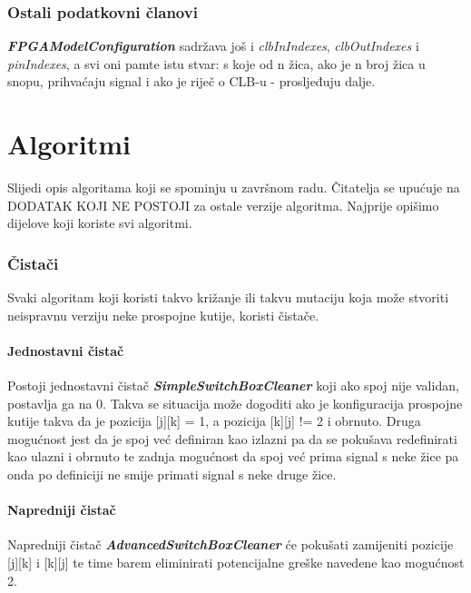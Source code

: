 \documentclass[times, utf8, zavrsni]{fer}
\begin{document}
\subsubsection{Ostali podatkovni članovi}

\textbf{\emph{FPGAModelConfiguration}} sadržava još i \emph{clbInIndexes}, \emph{clbOutIndexes} i \emph{pinIndexes}, a svi oni pamte istu stvar: s koje od n žica, ako je n broj žica u snopu, prihvaćaju signal i ako je riječ o CLB-u - prosljeđuju dalje.

\section{Algoritmi}

Slijedi opis algoritama koji se spominju u završnom radu. Čitatelja se upućuje na DODATAK KOJI NE POSTOJI za ostale verzije algoritma. Najprije opišimo dijelove koji koriste svi algoritmi.

\subsubsection{Čistači}

Svaki algoritam koji koristi takvo križanje ili takvu mutaciju koja može stvoriti neispravnu verziju neke prospojne kutije, koristi čistače. 

\paragraph{Jednostavni čistač}

Postoji jednostavni čistač \textbf{\emph{SimpleSwitchBoxCleaner}} koji ako spoj nije validan, postavlja ga na 0. Takva se situacija može dogoditi ako je konfiguracija prospojne kutije takva da je pozicija [j][k] = 1, a pozicija [k][j] != 2 i obrnuto. Druga mogućnost jest da je spoj već definiran kao izlazni pa da se pokušava redefinirati kao ulazni i obrnuto te zadnja mogućnost da spoj već prima signal s neke žice pa onda po definiciji ne smije primati signal s neke druge žice. 

\paragraph{Napredniji čistač}

Napredniji čistač \textbf{\emph{AdvancedSwitchBoxCleaner}} će pokušati zamijeniti pozicije [j][k] i [k][j] te time barem eliminirati potencijalne greške navedene kao mogućnost 2.
\end{document}
